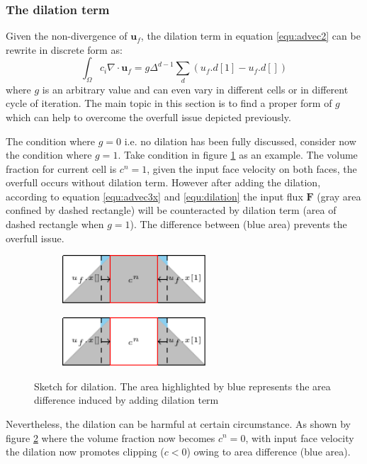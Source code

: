 \documentclass[a4paper]{article}
\begin{document}
\subsubsection{The dilation term}
Given the non-divergence of $\mathbf{u}_f$, the dilation term in equation \ref{equ:advec2} can be rewrite in discrete form as:
\begin{equation}\label{equ:dilation}
    \int_{\Omega}c_i\nabla\cdot\mathbf{u}_f = g\Delta^{d-1} \sum_d(u_f.d[1]-u_f.d[])
\end{equation}
where $g$ is an arbitrary value and can even vary in different cells or in different cycle of iteration. The main topic in this section is to find a proper form of $g$ which can help to overcome the overfull issue depicted previously.\par
The condition where $g=0$ i.e. no dilation has been fully discussed, consider now the condition where $g=1$. Take condition in figure \ref{fig:dilation1} as an example. The volume fraction for current cell is $c^n = 1$, given the input face velocity on both faces, the overfull occurs without dilation term. However after adding the dilation, according to equation \ref{equ:advec3x} and \ref{equ:dilation} the input flux $\mathbf{F}$ (gray area confined by dashed rectangle) will be counteracted by dilation term (area of dashed rectangle when $g=1$). The difference between (blue area) prevents the overfull issue.\par
\begin{figure}[!htbp]
    \centering
    \begin{subfigure}[b]{0.45\textwidth}
        \centering
        \includegraphics[height=1.83cm]{image/dilation1.pdf}
        \subcaption{}
        \label{fig:dilation1}
    \end{subfigure}
    \begin{subfigure}[b]{0.45\textwidth}
        \centering
        \includegraphics[height=1.83cm]{image/dilation2.pdf}
        \subcaption{}
        \label{fig:dilation2}
    \end{subfigure}
    \caption{Sketch for dilation. The area highlighted by blue represents the area difference induced by adding dilation term}
    \label{fig:dilation}
\end{figure}
Nevertheless, the dilation can be harmful at certain circumstance. As shown by figure \ref{fig:dilation2} where the volume fraction now becomes $c^n=0$, with input face velocity the dilation now promotes clipping ($c<0$) owing to area difference (blue area).
\end{document}
